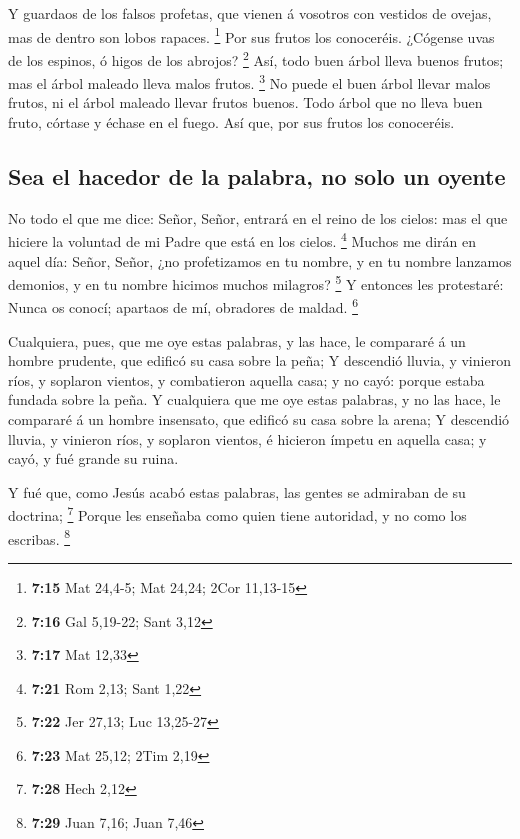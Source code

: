  Y guardaos de los falsos profetas, que vienen á vosotros
con vestidos de ovejas, mas de dentro son lobos rapaces. \footnote{\textbf{7:15}
  Mat 24,4-5; Mat 24,24; 2Cor 11,13-15}  Por sus frutos los
conoceréis. ¿Cógense uvas de los espinos, ó higos de los abrojos?
\footnote{\textbf{7:16} Gal 5,19-22; Sant 3,12}  Así, todo
buen árbol lleva buenos frutos; mas el árbol maleado lleva malos frutos.
\footnote{\textbf{7:17} Mat 12,33}  No puede el buen árbol
llevar malos frutos, ni el árbol maleado llevar frutos buenos.
 Todo árbol que no lleva buen fruto, córtase y échase en el
fuego.  Así que, por sus frutos los conoceréis.

\hypertarget{sea-el-hacedor-de-la-palabra-no-solo-un-oyente}{%
\subsection{Sea el hacedor de la palabra, no solo un
oyente}\label{sea-el-hacedor-de-la-palabra-no-solo-un-oyente}}

 No todo el que me dice: Señor, Señor, entrará en el reino
de los cielos: mas el que hiciere la voluntad de mi Padre que está en
los cielos. \footnote{\textbf{7:21} Rom 2,13; Sant 1,22} 
Muchos me dirán en aquel día: Señor, Señor, ¿no profetizamos en tu
nombre, y en tu nombre lanzamos demonios, y en tu nombre hicimos muchos
milagros? \footnote{\textbf{7:22} Jer 27,13; Luc 13,25-27} 
Y entonces les protestaré: Nunca os conocí; apartaos de mí, obradores de
maldad. \footnote{\textbf{7:23} Mat 25,12; 2Tim 2,19}

 Cualquiera, pues, que me oye estas palabras, y las hace,
le compararé á un hombre prudente, que edificó su casa sobre la peña;
 Y descendió lluvia, y vinieron ríos, y soplaron vientos, y
combatieron aquella casa; y no cayó: porque estaba fundada sobre la
peña.  Y cualquiera que me oye estas palabras, y no las
hace, le compararé á un hombre insensato, que edificó su casa sobre la
arena;  Y descendió lluvia, y vinieron ríos, y soplaron
vientos, é hicieron ímpetu en aquella casa; y cayó, y fué grande su
ruina.

 Y fué que, como Jesús acabó estas palabras, las gentes se
admiraban de su doctrina; \footnote{\textbf{7:28} Hech 2,12}
 Porque les enseñaba como quien tiene autoridad, y no como
los escribas. \footnote{\textbf{7:29} Juan 7,16; Juan 7,46}

